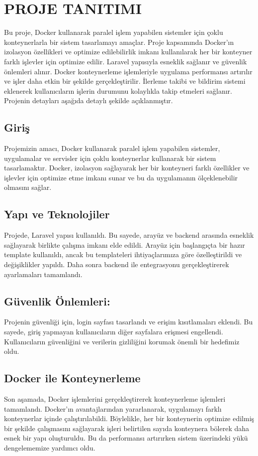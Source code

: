 \section{PROJE TANITIMI }

Bu proje, Docker kullanarak paralel işlem yapabilen sistemler için çoklu konteynerlarla bir sistem tasarlamayı amaçlar. Proje kapsamında Docker'ın izolasyon özellikleri ve optimize edilebilirlik imkanı kullanılarak her bir konteyner farklı işlevler için optimize edilir. Laravel yapısıyla esneklik sağlanır ve güvenlik önlemleri alınır. Docker konteynerleme işlemleriyle uygulama performansı artırılır ve işler daha etkin bir şekilde gerçekleştirilir. İlerleme takibi ve bildirim sistemi eklenerek kullanıcıların işlerin durumunu kolaylıkla takip etmeleri sağlanır. Projenin detayları aşağıda detaylı şekilde açıklanmıştır.
\subsection{Giriş}
Projemizin amacı, Docker kullanarak paralel işlem yapabilen sistemler, uygulamalar ve servisler için çoklu konteynerlar kullanarak bir sistem tasarlamaktır. Docker, izolasyon sağlayarak her bir konteyneri farklı özellikler ve işlevler için optimize etme imkanı sunar ve bu da uygulamanın ölçeklenebilir olmasını sağlar.
\subsection{Yapı ve Teknolojiler}
Projede, Laravel yapısı kullanıldı. Bu sayede, arayüz ve backend arasında esneklik sağlayarak birlikte çalışma imkanı elde edildi. Arayüz için başlangıçta bir hazır template kullanıldı, ancak bu templateleri ihtiyaçlarımıza göre özelleştirildi ve değişiklikler yapıldı. Daha sonra backend ile entegrasyonu gerçekleştirerek ayarlamaları tamamlandı.
\subsection{Güvenlik Önlemleri:}
Projenin güvenliği için, login sayfası tasarlandı ve erişim kısıtlamaları eklendi. Bu sayede, giriş yapmayan kullanıcıların diğer sayfalara erişmesi engellendi. Kullanıcıların güvenliğini ve verilerin gizliliğini korumak önemli bir hedefimiz oldu.
\subsection{Docker ile Konteynerleme}
Son aşamada, Docker işlemlerini gerçekleştirerek konteynerleme işlemleri tamamlandı. Docker'ın avantajlarından yararlanarak, uygulamayı farklı konteynerlar içinde çalıştırılabildi. Böylelikle, her bir konteynerin optimize edilmiş bir şekilde çalışmasını sağlayarak işleri belirtilen sayıda konteynera bölerek daha esnek bir yapı oluşturuldu. Bu da performansı artırırken sistem üzerindeki yükü dengelememize yardımcı oldu.
